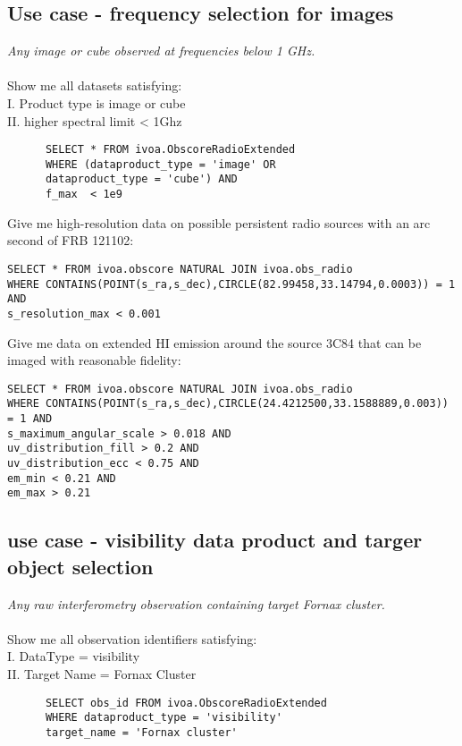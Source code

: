 \subsection{Use case - frequency selection  for images }
\textit{Any image or cube observed at frequencies below 1 GHz.}\\ \\
Show me all datasets satisfying:\\
I. Product type is image or cube \\
II. higher spectral limit < 1Ghz
\begin{verbatim}
      SELECT * FROM ivoa.ObscoreRadioExtended
      WHERE (dataproduct_type = 'image' OR
      dataproduct_type = 'cube') AND
      f_max  < 1e9
\end{verbatim}


 



Give me high-resolution data on possible persistent radio sources with
an arc second of FRB 121102:

\begin{verbatim}
SELECT * FROM ivoa.obscore NATURAL JOIN ivoa.obs_radio
WHERE CONTAINS(POINT(s_ra,s_dec),CIRCLE(82.99458,33.14794,0.0003)) = 1 AND
s_resolution_max < 0.001
\end{verbatim}

Give me data on extended HI emission around the source 3C84 that can
be imaged with reasonable fidelity:

\begin{verbatim}
SELECT * FROM ivoa.obscore NATURAL JOIN ivoa.obs_radio
WHERE CONTAINS(POINT(s_ra,s_dec),CIRCLE(24.4212500,33.1588889,0.003)) = 1 AND
s_maximum_angular_scale > 0.018 AND
uv_distribution_fill > 0.2 AND
uv_distribution_ecc < 0.75 AND
em_min < 0.21 AND
em_max > 0.21
\end{verbatim}


\subsection{ use case - visibility data product and targer object selection }
\textit{Any raw interferometry observation containing target Fornax cluster.}\\
\\
Show me all  observation identifiers satisfying:\\
I. DataType = visibility \\
II. Target Name = Fornax Cluster \\
\begin{verbatim}
      SELECT obs_id FROM ivoa.ObscoreRadioExtended
      WHERE dataproduct_type = 'visibility'
      target_name = 'Fornax cluster'
\end{verbatim}





